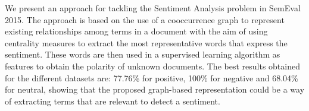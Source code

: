 We present an approach for tackling the Sentiment Analysis problem in SemEval 2015. The approach is based on the use of a cooccurrence graph to represent existing relationships among terms in a document with the aim of using centrality measures to extract the most representative words that express the sentiment. These words are then used in a supervised learning algorithm as features to obtain the polarity of unknown documents. The best results obtained for the different datasets are: 77.76\% for positive, 100\% for negative and 68.04\% for neutral, showing that the proposed graph-based representation could be a way of extracting terms that are relevant to detect a sentiment.
